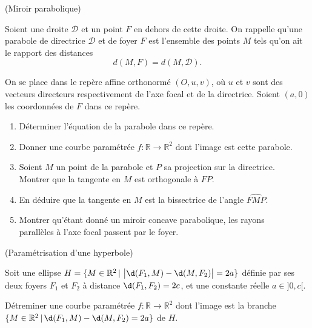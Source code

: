 \documentclass[a4paper,12pt,reqno]{amsart}
\begin{document}
\begin{exo} (Miroir parabolique)


  Soient une droite $\mathcal{D}$ et un point $F$ en dehors de cette droite. On rappelle qu'une parabole de directrice $\mathcal{D}$ et de foyer $F$ est l'ensemble des points $M$ tels qu'on ait le rapport des distances
  $$
    d(M,F)= d(M,\mathcal{D}).
  $$


  On se place dans le repère affine orthonormé $(O,u,v)$, où $u$ et $v$ sont des vecteurs directeurs respectivement de l'axe focal et de la directrice. Soient $(a,0)$ les coordonnées de $F$ dans ce repère.

  \begin{enumerate}

    \item Déterminer l'équation de la parabole dans ce repère.

    \item Donner une courbe paramétrée $f:\mathbb{R}\to\mathbb{R}^{2}$ dont l'image est cette parabole.

    \item Soient $M$ un point de la parabole et $P$ sa projection sur la directrice.\\
    Montrer que la tangente en $M$ est orthogonale à $FP$.

    \item En déduire que la tangente en $M$ est la bissectrice de l'angle $\widehat{FMP}$.

    \item Montrer qu'étant donné un miroir concave parabolique, les rayons\\
    parallèles à l'axe focal passent par le foyer.
  \end{enumerate}

\end{exo}

\begin{exo} (Paramétrisation d'une hyperbole)


  Soit une ellipse $H = \{ M \in \mathbb{R}^{2} \,|\ \big|\d(F_{1},M)-\d(M,F_{2})\big|=2a\}$ définie par ses deux foyers $F_{1}$ et $F_{2}$ à distance $\d(F_{1},F_{2})=2c$, et une constante réelle $a \in ]0,c[$.

  Détreminer une courbe paramétrée $f:\mathbb{R}\to\mathbb{R}^{2}$ dont l'image est la branche $\{ M \in \mathbb{R}^{2} \,|\, \d(F_{1},M)-\d(M,F_{2})=2a\}$ de $H$.
\end{exo}
\end{document}
